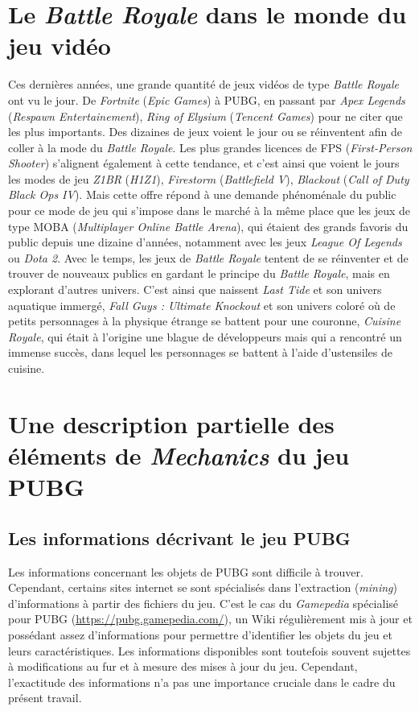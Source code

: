\section{Le \emph{Battle Royale} dans le monde du jeu vidéo}
Ces dernières années, une grande quantité de jeux vid\'eos de type \emph{Battle Royale} ont vu le jour. De \emph{Fortnite} (\emph{Epic Games}) à PUBG, en passant par \emph{Apex Legends} (\emph{Respawn Entertainement}), \emph{Ring of Elysium} (\emph{Tencent Games}) pour ne citer que les plus importants. Des dizaines de jeux voient le jour ou se réinventent afin de coller à la mode du \emph{Battle Royale}. Les plus grandes licences de FPS (\emph{First-Person Shooter}) s'alignent également à cette tendance, et c'est ainsi que voient le jours les modes de jeu \emph{Z1BR} (\emph{H1Z1}), \emph{Firestorm} (\emph{Battlefield V}), \emph{Blackout} (\emph{Call of Duty Black Ops IV}). Mais cette offre répond à une demande phénoménale du public pour ce mode de jeu qui s'impose dans le marché à la même place que les jeux de type MOBA (\emph{Multiplayer Online Battle Arena}), qui étaient des grands favoris du public depuis une dizaine d'années, notamment avec les jeux \emph{League Of Legends} ou \emph{Dota 2}. Avec le temps, les jeux de \emph{Battle Royale} tentent de se réinventer et de trouver de nouveaux publics en gardant le principe du \emph{Battle Royale}, mais en explorant d'autres univers. C'est ainsi que naissent \emph{Last Tide} et son univers aquatique immergé, \emph{Fall Guys : Ultimate Knockout} et son univers coloré où de petits personnages à la physique étrange se battent pour une couronne, \emph{Cuisine Royale}, qui était à l'origine une blague de développeurs mais qui a rencontré un immense succès, dans lequel les personnages se battent à l'aide d'ustensiles de cuisine.

\section{Une description partielle des \'el\'ements de \emph{Mechanics} du jeu PUBG}
\subsection{Les informations d\'ecrivant le jeu PUBG}
Les informations concernant les objets de PUBG sont difficile à trouver.
Cependant, certains sites internet se sont spécialisés dans l'extraction (\emph{mining}) d'informations à partir des fichiers du jeu.
C'est le cas du \emph{Gamepedia} spécialisé pour PUBG (\url{https://pubg.gamepedia.com/}),
un Wiki régulièrement mis à jour et possédant assez d'informations pour permettre d'identifier les objets du jeu et leurs caractéristiques.
Les informations disponibles sont toutefois souvent sujettes à modifications au fur et à mesure des mises à jour du jeu.
Cependant, l'exactitude des informations n'a pas une importance cruciale dans le cadre du pr\'esent travail.


